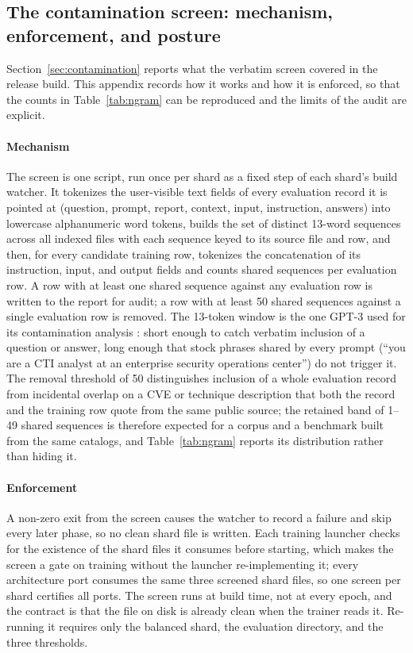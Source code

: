 \documentclass[twocolumn]{svjour3}
\begin{document}
\begin{appendix}
\section{The contamination screen: mechanism, enforcement, and posture}\label{app:contamination}
Section~\ref{sec:contamination} reports what the verbatim screen covered in the release build. This appendix records how it works and how it is enforced, so that the counts in Table~\ref{tab:ngram} can be reproduced and the limits of the audit are explicit.

\paragraph{Mechanism}
The screen is one script, run once per shard as a fixed step of each shard's build watcher. It tokenizes the user-visible text fields of every evaluation record it is pointed at (question, prompt, report, context, input, instruction, answers) into lowercase alphanumeric word tokens, builds the set of distinct 13-word sequences across all indexed files with each sequence keyed to its source file and row, and then, for every candidate training row, tokenizes the concatenation of its instruction, input, and output fields and counts shared sequences per evaluation row. A row with at least one shared sequence against any evaluation row is written to the report for audit; a row with at least 50 shared sequences against a single evaluation row is removed. The 13-token window is the one GPT-3 used for its contamination analysis \cite{brown2020gpt3}: short enough to catch verbatim inclusion of a question or answer, long enough that stock phrases shared by every prompt (``you are a CTI analyst at an enterprise security operations center'') do not trigger it. The removal threshold of 50 distinguishes inclusion of a whole evaluation record from incidental overlap on a CVE or technique description that both the record and the training row quote from the same public source; the retained band of 1--49 shared sequences is therefore expected for a corpus and a benchmark built from the same catalogs, and Table~\ref{tab:ngram} reports its distribution rather than hiding it.

\paragraph{Enforcement}
A non-zero exit from the screen causes the watcher to record a failure and skip every later phase, so no clean shard file is written. Each training launcher checks for the existence of the shard files it consumes before starting, which makes the screen a gate on training without the launcher re-implementing it; every architecture port consumes the same three screened shard files, so one screen per shard certifies all ports. The screen runs at build time, not at every epoch, and the contract is that the file on disk is already clean when the trainer reads it. Re-running it requires only the balanced shard, the evaluation directory, and the three thresholds.


\end{appendix}
\end{document}
